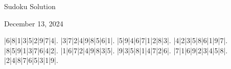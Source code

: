 \documentclass{article}
\begin{document}
\begin{center}
\Huge{Sudoku Solution}
\end{center}
\begin{center}
\Large{December 13, 2024}
\end{center}
\begin{sudoku}
|6|8|1|3|5|2|9|7|4|.
|3|7|2|4|9|8|5|6|1|.
|5|9|4|6|7|1|2|8|3|.
|4|2|3|5|8|6|1|9|7|.
|8|5|9|1|3|7|6|4|2|.
|1|6|7|2|4|9|8|3|5|.
|9|3|5|8|1|4|7|2|6|.
|7|1|6|9|2|3|4|5|8|.
|2|4|8|7|6|5|3|1|9|.
\end{sudoku}
\end{document}
